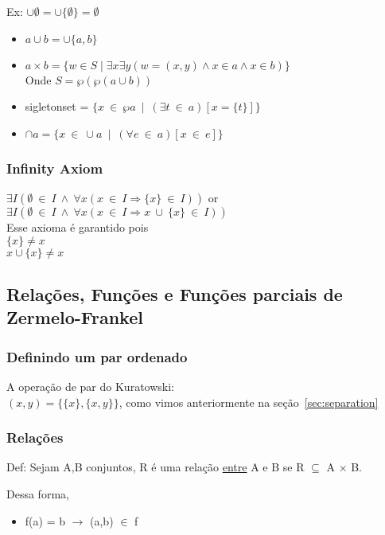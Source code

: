 \documentclass[12pt, a4paper]{article}
\begin{document}
				Ex: $\cup \emptyset = \cup \{ \emptyset \} = \emptyset$

				\begin{itemize}
				\item $a \cup b = \cup \{a,b\}$
				\item $ a \times b = \{ w \in S \mid \exists x \exists y (w = (x,y) \land x \in a \land x \in b)\}$ \\
						Onde $S = \wp(\wp(a \cup b))$
				\item sigletonset = $\{ x ~ \in ~ \wp a ~\mid~ (\exists t ~\in~ a)[x = \{t\}]\}$
				\item $\cap a = \{x ~\in~ \cup a ~\mid~ (\forall e ~\in~ a)[x ~\in~ e]\}$
				\end{itemize}

			\subsubsection{Infinity Axiom}
				$\exists I (\emptyset ~\in~ I ~\land~ \forall x (x ~\in~ I \Rightarrow \{x\} ~\in~ I ))$ or\\
				$\exists I (\emptyset ~\in~ I ~\land~ \forall x (x ~\in~ I \Rightarrow x ~\cup~ \{x\} ~\in~ I ))$\\

				Esse axioma \'e garantido pois\\
				$\{x\} \ne x $\\
				$ x \cup \{x\} \ne x $

			\subsection{Rela\c{c}\~oes, Fun\c{c}\~oes e Fun\c{c}\~oes parciais de Zermelo-Frankel}
			\subsubsection{Definindo um par ordenado}
				A opera\c{c}\~ao de par do Kuratowski:\\
				$ (x, y) = \{ \{x\}, \{x, y\}\} $, como vimos anteriormente na se\c{c}\~ao~\ref{sec:separation}

			\subsubsection{Rela\c{c}\~oes}
				
				Def: Sejam A,B conjuntos, R \'e uma rela\c{c}\~ao \underline{entre} A e B se R $\subseteq$ A $\times$ B.

				Dessa forma, 
				\begin{itemize}
				\item f(a) = b $\to$ (a,b) $\in$ f
				\end{itemize}
\end{document}

